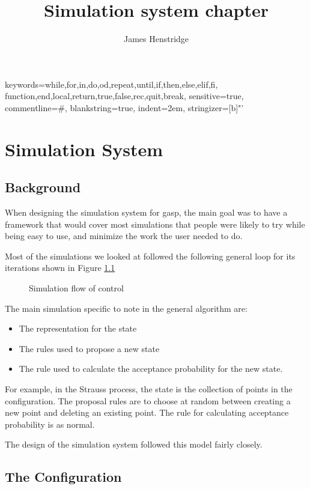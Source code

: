\documentclass[12pt,a4paper]{book}  %
\begin{document}
%
  {keywords={while,for,in,do,od,repeat,until,if,then,else,elif,fi,
      function,end,local,return,true,false,rec,quit,break},%
  sensitive=true,%
  commentline={\#},%
  blankstring=true,%
  indent=2em,%
  stringizer=[b]{"'}%
}%
\lstset{language=Gap}

\title{Simulation system chapter}
\author{James Henstridge}

\chapter{Simulation System}


\section{Background}

When designing the simulation system for gasp, the main goal was to
have a framework that would cover most simulations that people were
likely to try while being easy to use, and minimize the work the
user needed to do.

Most of the simulations we looked at followed the following general
loop for its iterations shown in Figure \ref{fig:flowchart}

\begin{figure}
\label{fig:flowchart}
\centering
{}
\caption{Simulation flow of control}
\end{figure}

The main simulation specific to note in the general algorithm are:

\begin{itemize}
\item The representation for the state
\item The rules used to propose a new state
\item The rule used to calculate the acceptance probability for the
new state.
\end{itemize}

For example, in the Strauss process, the state is the collection of
points in the configuration.  The proposal rules are to choose at
random between creating a new point and deleting an existing point.
The rule for calculating acceptance probability is as normal.

The design of the simulation system followed this model fairly
closely.

\section{The Configuration}
\end{document}
